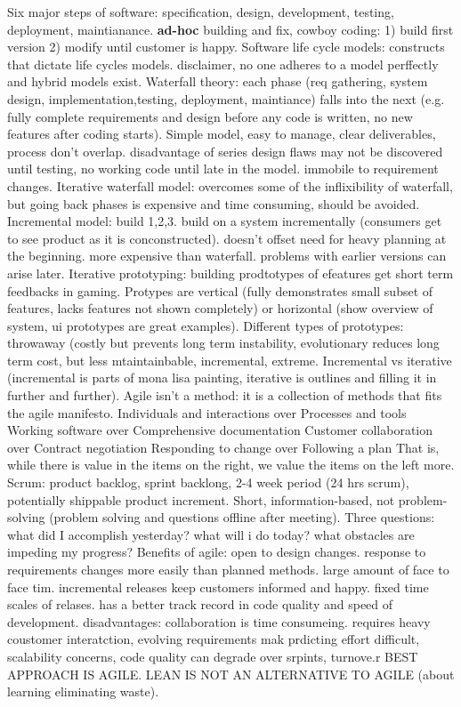 \documentclass[10pt]{article}
\begin{document}
\begin{landscape}
\begin{multicols*}{6}
Six major steps of software: specification, design, development, testing, deployment, maintianance. \textbf{ad-hoc} building and fix, cowboy coding: 1) build first version 2) modify until customer is happy. 
Software life cycle models: constructs that dictate life cycles models. disclaimer, no one adheres to a model perffectly and hybrid models exist. 
Waterfall theory: each phase (req gathering, system design, implementation,testing, deployment, maintiance) falls into the next (e.g. fully complete requirements and design before any code is written, no new features after coding starts). Simple model, easy to manage, clear deliverables, process don't overlap. disadvantage of series design flaws may not be discovered until testing, no working code until late in the model. immobile to requirement changes. Iterative waterfall model: overcomes some of the inflixibility of waterfall, but going back phases is expensive and time consuming, should be avoided. 
Incremental model: build 1,2,3. build on a system incrementally (consumers get to see product as it is conconstructed). doesn't offset need for heavy planning at the beginning. more expensive than waterfall. problems with earlier versions can arise later. 
Iterative prototyping: building prodtotypes of efeatures get short term feedbacks in gaming. Protypes are vertical (fully demonstrates small subset of features, lacks features not shown completely) or horizontal (show overview of system, ui prototypes are great examples). 
Different types of prototypes: throwaway (costly but prevents long term instability, evolutionary reduces long term cost, but less mtaintainbable, incremental, extreme. 
Incremental vs iterative (incremental is parts of mona lisa painting, iterative is outlines and filling it in further and further). 
Agile isn't a method: it is a collection of methods that fits the agile manifesto. Individuals and interactions over Processes and tools Working software over Comprehensive documentation Customer collaboration over Contract negotiation Responding to change over Following a plan
That is, while there is value in the items on the right, we value the items on the left more. 
Scrum: product backlog, sprint backlong, 2-4 week period (24 hrs  scrum), potentially shippable product increment. Short, information-based, not problem-solving (problem solving and questions offline after meeting). Three questions: what did I accomplish yesterday? what will i do today? what obstacles are impeding my progress? 
Benefits of agile: open to design changes. response to requirements changes more easily than planned methods. large amount of face to face tim. incremental releases keep customers informed and happy. fixed time scales of relases. has a better track record in code quality and speed of development. disadvantages: collaboration is time consumeing. requires heavy coustomer interatction, evolving requirements mak prdicting effort difficult, scalability concerns, code  quality can degrade over srpints, turnove.r BEST APPROACH IS AGILE. LEAN IS NOT AN ALTERNATIVE TO AGILE (about learning eliminating waste). 

\end{multicols*}
\end{landscape}
\end{document}
